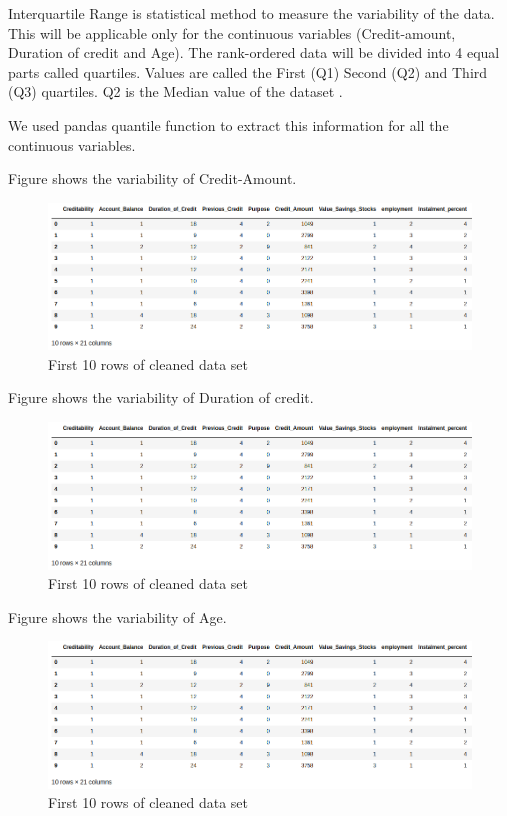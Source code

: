 \documentclass[sigconf]{acmart}
\begin{document}
Interquartile Range is statistical method to measure the variability of the data. This will be applicable only for the continuous variables (Credit-amount, Duration of credit and Age). The rank-ordered data will be divided into 4 equal parts called quartiles. Values are called the First (Q1) Second (Q2) and Third (Q3) quartiles. Q2 is the Median value of the dataset \cite{stat-trek-statistics}.

We used pandas quantile function to extract this information for all the continuous variables.

Figure shows the variability of Credit-Amount.

\begin{figure}[htb]
  \centering
  \includegraphics[width=1.0\columnwidth]{project/images/Figure3.png}
  \caption{First 10 rows of cleaned data set
  \cite{psu-site}}
  \label{fig:Figure3} 
\end{figure}

Figure shows the variability of Duration of credit.

\begin{figure}[htb]
  \centering
  \includegraphics[width=1.0\columnwidth]{project/images/Figure3.png}
  \caption{First 10 rows of cleaned data set
  \cite{psu-site}}
  \label{fig:Figure3} 
\end{figure}

Figure shows the variability of Age.

\begin{figure}[htb]
  \centering
  \includegraphics[width=1.0\columnwidth]{project/images/Figure3.png}
  \caption{First 10 rows of cleaned data set
  \cite{psu-site}}
  \label{fig:Figure3} 
\end{figure}
\end{document}
